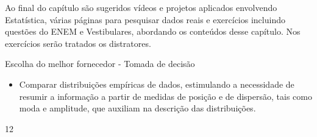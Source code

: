 \begin{apresentacao}
\begin{enumerate}
\end{enumerate}

Ao final do capítulo são sugeridos vídeos e projetos aplicados envolvendo  Estatística, várias páginas para pesquisar dados reais e exercícios incluindo questões do ENEM e Vestibulares, abordando os conteúdos desse capítulo. Nos exercícios serão tratados os distratores.

\end{apresentacao}


\def\currentcolor{session1}
\clearmargin
\begin{objectives}{Escolha do melhor fornecedor - Tomada de decisão}
{
\begin{itemize}

\item Comparar distribuições empíricas de dados, estimulando a necessidade de resumir a informação a partir de medidas de posição e de dispersão, tais como moda e amplitude, que auxiliam na descrição das distribuições.

\end{itemize}
}{1}{2}
\end{objectives}
